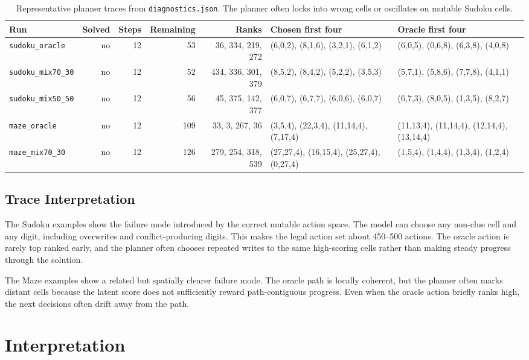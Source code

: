 \documentclass[11pt]{article}
\begin{document}
\begin{longtable}{lrrrrp{}p{}}
\caption{Representative planner traces from \texttt{diagnostics.json}. The planner often locks into wrong cells or oscillates on mutable Sudoku cells.}\\
\toprule
Run & Solved & Steps & Remaining & Ranks & Chosen first four & Oracle first four \\
\midrule
\endhead
\texttt{sudoku\_oracle} & no & 12 & 53 & 36, 334, 219, 272 &
(6,0,2), (8,1,6), (3,2,1), (6,1,2) &
(6,0,5), (0,6,8), (6,3,8), (4,0,8) \\
\texttt{sudoku\_mix70\_30} & no & 12 & 52 & 434, 336, 301, 379 &
(8,5,2), (8,4,2), (5,2,2), (3,5,3) &
(5,7,1), (5,8,6), (7,7,8), (4,1,1) \\
\texttt{sudoku\_mix50\_50} & no & 12 & 56 & 45, 375, 142, 377 &
(6,0,7), (6,7,7), (6,0,6), (6,0,7) &
(6,7,3), (8,0,5), (1,3,5), (8,2,7) \\
\texttt{maze\_oracle} & no & 12 & 109 & 33, 3, 267, 36 &
(3,5,4), (22,3,4), (11,14,4), (7,17,4) &
(11,13,4), (11,14,4), (12,14,4), (13,14,4) \\
\texttt{maze\_mix70\_30} & no & 12 & 126 & 279, 254, 318, 539 &
(27,27,4), (16,15,4), (25,27,4), (0,27,4) &
(1,5,4), (1,4,4), (1,3,4), (1,2,4) \\
\bottomrule
\end{longtable}

\subsection{Trace Interpretation}

The Sudoku examples show the failure mode introduced by the correct mutable
action space. The model can choose any non-clue cell and any digit, including
overwrites and conflict-producing digits. This makes the legal action set about
450--500 actions. The oracle action is rarely top ranked early, and the planner
often chooses repeated writes to the same high-scoring cells rather than making
steady progress through the solution.

The Maze examples show a related but spatially clearer failure mode. The oracle
path is locally coherent, but the planner often marks distant cells because the
latent score does not sufficiently reward path-contiguous progress. Even when
the oracle action briefly ranks high, the next decisions often drift away from
the path.

\section{Interpretation}
\end{document}
